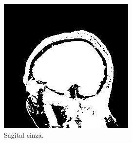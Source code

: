 \documentclass{article}
\begin{document}
\begin{figure}[h]
    \centering
    \begin{subfigure}[b]{0.3\textwidth}
        \includegraphics[width=\textwidth]{brain/radiologist-sagital-gray.png}
        \caption{Sagital cinza.}
    \end{subfigure}
    ~
    \begin{subfigure}[b]{0.3\textwidth}

\end{subfigure}
\end{figure}
\end{document}
